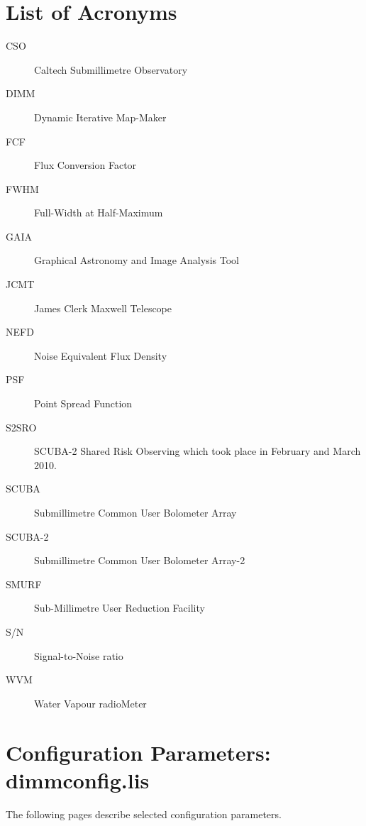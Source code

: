 \documentclass[twoside,11pt]{article}
\newcommand{\xlabel}[1]{}
\renewcommand{\_}{\texttt{\symbol{95}}}
\begin{document}
\section{\xlabel{acronyms}List of Acronyms}

\begin{description}

\item[CSO]\quad Caltech Submillimetre Observatory

\item[DIMM]\quad Dynamic Iterative Map-Maker

\item[FCF]\quad Flux Conversion Factor

\item[FWHM]\quad Full-Width at Half-Maximum

\item[GAIA]\quad Graphical Astronomy and Image Analysis Tool

\item[JCMT]\quad James Clerk Maxwell Telescope

\item[NEFD]\quad Noise Equivalent Flux Density

\item[PSF]\quad Point Spread Function

\item[S2SRO]\quad SCUBA-2 Shared Risk Observing which took place in
  February and March 2010.

\item[SCUBA]\quad Submillimetre Common User Bolometer Array

\item[SCUBA-2]\quad Submillimetre Common User Bolometer Array-2

\item[SMURF]\quad Sub-Millimetre User Reduction Facility

\item[S/N]\quad Signal-to-Noise ratio

\item[WVM]\quad Water Vapour radioMeter


\end{description}

\section{\xlabel{par_full}Configuration Parameters: dimmconfig.lis}
\label{app:par_full}

The following pages describe selected configuration parameters.
\end{document}
